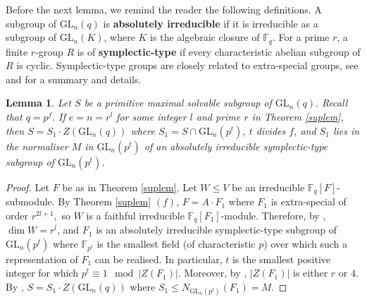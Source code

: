 \documentclass[a4paper,reqno,11pt]{amsart}
\newtheorem{Lem}[Th]{Lemma}
\theoremstyle{definition}
\theoremstyle{remark}
\numberwithin{equation}{section}
\newcommand{\GL}{{\mathrm{GL}}}
\begin{document}
Before the next lemma, we remind the reader the following definitions.
A subgroup of $\GL_n(q)$ is {\bf absolutely irreducible} if it is irreducible as a subgroup of $\GL_n(K)$, where $K$ is the algebraic closure of $\mathbb{F}_q.$ For a prime $r$, a finite $r$-group $R$ is of {\bf symplectic-type} if every characteristic abelian subgroup of $R$ is cyclic. Symplectic-type groups are closely related to extra-special groups, see \cite[\S 4.6]{kleidlieb} and \cite[\S 2.4]{short} for a summary and details.

\begin{Lem}
\label{c6small}
 Let $S$ be a primitive maximal solvable subgroup of $\GL_n(q).$  Recall that $q=p^f.$ If $e=n=r^l$ for some integer $l$ and prime $r$ in Theorem \ref{suplem}, then  $S=S_1 \cdot Z(\GL_n(q))$ where $S_1=S \cap \GL_n(p^t)$,   $t$ divides $f$, and $S_1$ lies in the normaliser $M$ in $\GL_n(p^t)$ of an absolutely irreducible symplectic-type subgroup of $\GL_n(p^t)$. %
\end{Lem}
\begin{proof}
Let $F$  be as in Theorem \ref{suplem}. Let $W \le V$ be an irreducible $\mathbb{F}_{q}[F]$-submodule. By  Theorem \ref{suplem} $(f)$, $F=A \cdot F_1$ where $F_1$ is extra-special of order $r^{2l+1},$ so $W$ is a faithful irreducible $\mathbb{F}_{q}[F_1]$-module. Therefore, by \cite[Propositions 4.6.2 and 4.6.3]{kleidlieb}, $\dim W=r^{l}$, and $F_1$ is an absolutely irreducible symplectic-type subgroup of $ \GL_n(p^t)$  where $\mathbb{F}_{p^t}$ is the smallest field (of characteristic $p$) over which such a representation of $F_1$ can be realised. In particular, $t$ is the smallest positive integer for which $p^t \equiv 1 \mod |Z(F_1)|.$ Moreover, by \cite[Corollary 2.4.12]{short}, $|Z(F_1)|$ is either $r$ or $4$.  By  \cite[Theorem 2.4.12]{short}, $S=S_1 \cdot Z(\GL_n(q))$ where $S_1 \le N_{\GL_n(p^t)}(F_1)=M.$     %
\end{proof}
\end{document}
